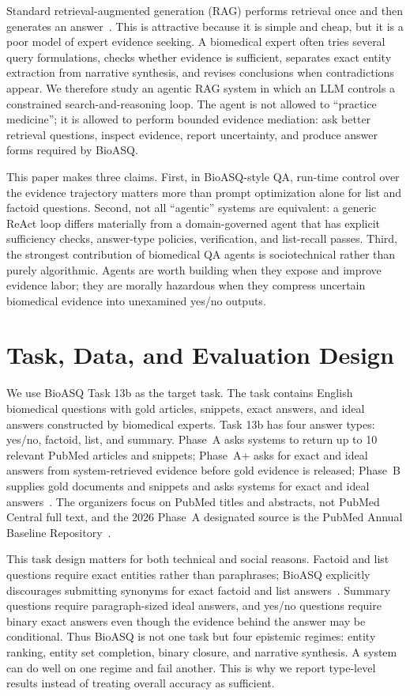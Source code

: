 \documentclass[sigconf,nonacm]{acmart}
\begin{document}
Standard retrieval-augmented generation (RAG) performs retrieval once and then generates an answer~\cite{lewis2020rag}. This is attractive because it is simple and cheap, but it is a poor model of expert evidence seeking. A biomedical expert often tries several query formulations, checks whether evidence is sufficient, separates exact entity extraction from narrative synthesis, and revises conclusions when contradictions appear. We therefore study an agentic RAG system in which an LLM controls a constrained search-and-reasoning loop. The agent is not allowed to ``practice medicine''; it is allowed to perform bounded evidence mediation: ask better retrieval questions, inspect evidence, report uncertainty, and produce answer forms required by BioASQ.

This paper makes three claims. First, in BioASQ-style QA, run-time control over the evidence trajectory matters more than prompt optimization alone for list and factoid questions. Second, not all ``agentic'' systems are equivalent: a generic ReAct loop differs materially from a domain-governed agent that has explicit sufficiency checks, answer-type policies, verification, and list-recall passes. Third, the strongest contribution of biomedical QA agents is sociotechnical rather than purely algorithmic. Agents are worth building when they expose and improve evidence labor; they are morally hazardous when they compress uncertain biomedical evidence into unexamined yes/no outputs.

\section{Task, Data, and Evaluation Design}

We use BioASQ Task 13b as the target task. The task contains English biomedical questions with gold articles, snippets, exact answers, and ideal answers constructed by biomedical experts. Task 13b has four answer types: yes/no, factoid, list, and summary. Phase~A asks systems to return up to 10 relevant PubMed articles and snippets; Phase~A+ asks for exact and ideal answers from system-retrieved evidence before gold evidence is released; Phase~B supplies gold documents and snippets and asks systems for exact and ideal answers~\cite{bioasq_task14b}. The organizers focus on PubMed titles and abstracts, not PubMed Central full text, and the 2026 Phase~A designated source is the PubMed Annual Baseline Repository~\cite{pubmed_home}.

This task design matters for both technical and social reasons. Factoid and list questions require exact entities rather than paraphrases; BioASQ explicitly discourages submitting synonyms for exact factoid and list answers~\cite{bioasq_task14b}. Summary questions require paragraph-sized ideal answers, and yes/no questions require binary exact answers even though the evidence behind the answer may be conditional. Thus BioASQ is not one task but four epistemic regimes: entity ranking, entity set completion, binary closure, and narrative synthesis. A system can do well on one regime and fail another. This is why we report type-level results instead of treating overall accuracy as sufficient.
\end{document}

